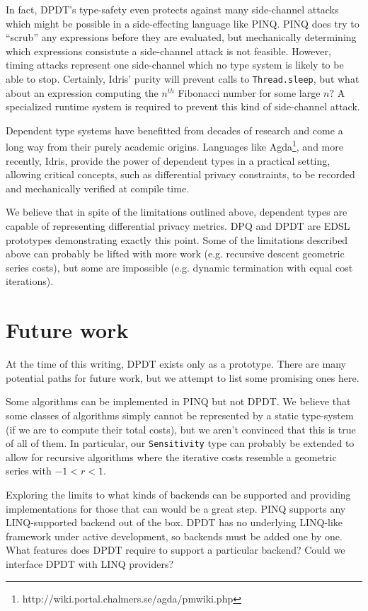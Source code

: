 \documentclass[12pt]{report}
\begin{document}
In fact, DPDT's type-safety even protects against many side-channel attacks which might be possible in a side-effecting language like PINQ.
PINQ does try to ``scrub'' any expressions before they are evaluated, but mechanically determining which expressions consistute a side-channel attack is not feasible.
However, timing attacks represent one side-channel which no type system is likely to be able to stop.
Certainly, Idris' purity will prevent calls to \texttt{Thread.sleep}, but what about an expression computing the $n^{th}$ Fibonacci number for some large $n$?
A specialized runtime system is required to prevent this kind of side-channel attack\cite{conf/uss/HaeberlenPN11}.

Dependent type systems have benefitted from decades of research and come a long way from their purely academic origins.
Languages like Agda\footnote{http://wiki.portal.chalmers.se/agda/pmwiki.php}, and more recently, Idris, provide the power of dependent types in a practical setting, allowing critical concepts, such as differential privacy constraints, to be recorded and mechanically verified at compile time.

We believe that in spite of the limitations outlined above, dependent types are capable of representing differential privacy metrics.
DPQ and DPDT are EDSL prototypes demonstrating exactly this point.
Some of the limitations described above can probably be lifted with more work (e.g. recursive descent geometric series costs), but some are impossible (e.g. dynamic termination with equal cost iterations).

\section{Future work}\label{sec:future_work}

At the time of this writing, DPDT exists only as a prototype.
There are many potential paths for future work, but we attempt to list some promising ones here.

Some algorithms can be implemented in PINQ but not DPDT.
We believe that some classes of algorithms simply cannot be represented by a static type-system (if we are to compute their total costs), but we aren't convinced that this is true of all of them.
In particular, our \texttt{Sensitivity} type can probably be extended to allow for recursive algorithms where the iterative costs resemble a geometric series with $-1 < r < 1$.

Exploring the limits to what kinds of backends can be supported and providing implementations for those that can would be a great step.
PINQ supports any LINQ-supported backend out of the box.
DPDT has no underlying LINQ-like framework under active development, so backends must be added one by one.
What features does DPDT require to support a particular backend?
Could we interface DPDT with LINQ providers?
\end{document}
